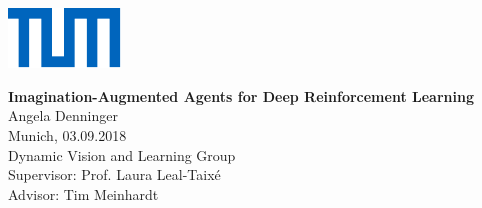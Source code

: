 \newcommand{\thema}{Imagination-Augmented Agents for Deep Reinforcement Learning}
\newcommand{\schlagworte}{}

\newcommand{\zusammenfassung}{bla

\vspace*{0.3cm}

blub
}


\newcommand{\autor}{Angela Denninger}
\newcommand{\autorStrasse}{Hindenburgstr. 13}
\newcommand{\autorPLZ}{78467 }
\newcommand{\autorOrt}{Garching bei München}

\newcommand{\autorGeburtsort}{Tübingen}
\newcommand{\autorGeburtsdatum}{17.06.1990}

\newcommand{\supervisor}{Prof. Laura Leal-Taixé}
\newcommand{\advisor}{Tim Meinhardt}


\newpage

\begin{titlepage}

\vspace*{-1.5cm}
\begin{flushleft}
\hspace*{-1cm} \includegraphics[width=3.0cm]{Images/Universitaet_Logo_RGB}
\end{flushleft}

\vspace{2.5cm}

\begin{center}
	\huge{\textbf{\thema}} \\[1.5cm]

	\LARGE{\autor} \\[0.5cm]
	
	\large{Munich, 03.09.2018}\\[2.3cm]	
	
	\Large{Dynamic Vision and Learning Group}\\[1.5cm]
	
	\large{Supervisor: \supervisor}\\
	\large{Advisor: \advisor}
\end{center}

\vspace*{3.5cm}



\end{titlepage}

